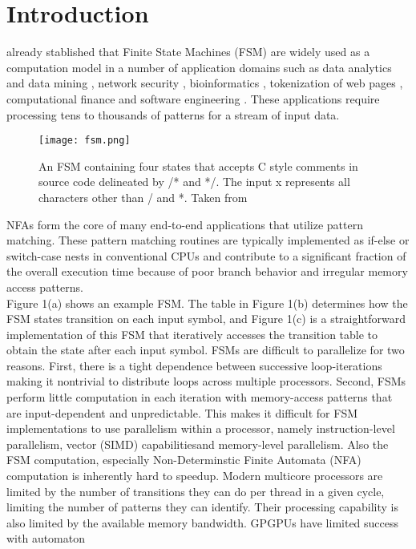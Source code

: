 \section{\textbf{Introduction}}
 already stablished that  Finite State Machines (FSM) are widely used as a computation
model in a number of application domains such as data analytics
and data mining \cite{3,4}, network security \cite{5}, bioinformatics \cite{6,7}, tokenization of web pages \cite{9}, computational
finance \cite{9} and software engineering \cite{10}. These applications require processing tens to thousands of patterns for a stream of
input data.\\
\begin{figure}[!h]
    \texttt{[image: fsm.png]}
    \caption{An FSM containing four states that accepts C style comments in source code delineated by /* and */. The
    input x represents all characters other than / and *. Taken from \cite{2}}
    \centering
\end{figure}
NFAs form the core of many end-to-end applications that utilize pattern matching.
 These pattern matching routines are typically
implemented as if-else or switch-case nests in conventional CPUs
and contribute to a significant fraction of the overall execution time
because of poor branch behavior and irregular memory access patterns.\\
Figure 1(a)  shows an example FSM.
The table in Figure 1(b) determines how the FSM states transition
 on each input symbol, and Figure 1(c) is a straightforward implementation of this FSM that iteratively accesses
the transition table to obtain the state after each input symbol.
FSMs are difficult to parallelize for two reasons. First,
there is a tight dependence between successive loop-iterations
making it nontrivial to distribute loops across multiple
processors. Second, FSMs perform little computation in
each iteration with memory-access patterns that are input-dependent and unpredictable.
This makes it difficult for
FSM implementations to use parallelism within a processor,
namely instruction-level parallelism, vector (SIMD) capabilitiesand memory-level parallelism.
Also the FSM computation, especially Non-Determinstic Finite Automata
(NFA) computation is inherently hard to speedup. Modern multicore
 processors are limited by the number of transitions they can do
per thread in a given cycle, limiting the number of patterns they can
identify. Their processing capability is also limited by the available
memory bandwidth. GPGPUs have limited success with automaton

